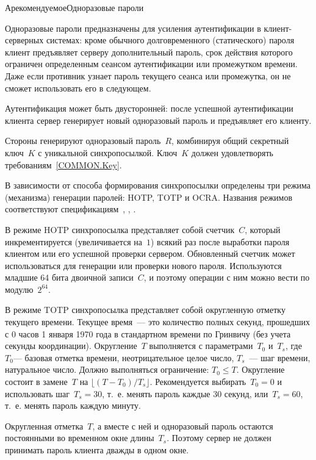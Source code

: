 \providecommand\Name{\text{Name}\xspace}

\begin{appendix}{А}{рекомендуемое}{Одноразовые пароли}
\label{OTP}


Одноразовые пароли предназначены для усиления аутентификации в клиент-серверных системах:
кроме обычного долговременного (статического) пароля клиент 
предъявляет серверу дополнительный пароль, срок действия которого ограничен определенным 
сеансом аутентификации или промежутком времени. Даже если противник узнает 
пароль текущего сеанса или промежутка, он не сможет использовать его в следующем.

Аутентификация может быть двусторонней:
после успешной аутентификации клиента сервер 
генерирует новый одноразовый пароль и предъявляет его клиенту. 


Стороны генерируют одноразовый пароль~$R$,
комбинируя общий секретный ключ~$K$ с уникальной синхропосылкой.
Ключ~$K$ должен удовлетворять требованиям~\ref{COMMON.Key}.

В зависимости от способа формирования синхропосылки определены
три режима (механизма) генерации паролей: HOTP, TOTP и OCRA.
Названия режимов соответствуют спецификациям~\cite{HOTP}, \cite{TOTP}, 
\cite{OCRA}.

В режиме HOTP синхропосылка представляет собой счетчик~$C$,
который инкрементируется (увеличивается на~$1$) 
всякий раз после выработки пароля клиентом или его успешной 
проверки сервером. 
%
Обновленный счетчик может использоваться для генерации или 
проверки нового пароля.
%
Используются младшие 64 бита двоичной записи~$C$,
и поэтому операции с ним можно вести по модулю~$2^{64}$.

В режиме TOTP синхропосылка представляет собой  
округленную отметку текущего времени. Текущее время~--- это количество полных 
секунд, прошедших с 0 часов 1 января 1970 года в стандартном времени по Гринвичу
(без учета секунды координации). 
%
Округление~$T$ выполняется с параметрами~$T_0$ и~$T_s$,
где~$T_0$--- базовая отметка времени, неотрицательное целое число, 
$T_s$~--- шаг времени, натуральное число. 
%
Должно выполняться ограничение: $T_0\leq T$.
%
Округление состоит в замене~$T$ на $\lfloor(T-T_0)/T_s\rfloor$.
%
Рекомендуется выбирать~$T_0=0$ и использовать шаг~$T_s=30$, 
т.~е. менять пароль каждые 30 секунд,
или~$T_s=60$, т.~е. менять пароль каждую минуту.

Округленная отметка~$T$, а вместе с ней и одноразовый пароль
остаются постоянными во временном окне длины~$T_s$.
Поэтому сервер не должен принимать пароль клиента 
дважды в одном окне. 


\end{appendix}

